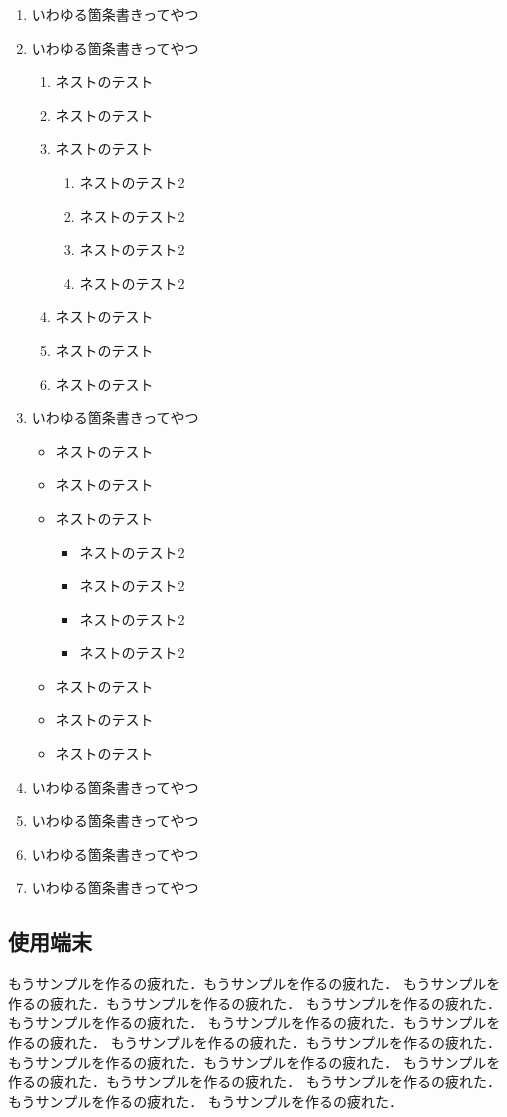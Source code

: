 \begin{enumerate}
\item いわゆる箇条書きってやつ
\item いわゆる箇条書きってやつ
 \begin{enumerate}
    \item ネストのテスト
    \item ネストのテスト
    \item ネストのテスト
     \begin{enumerate}
       \item ネストのテスト2
       \item ネストのテスト2
       \item ネストのテスト2
       \item ネストのテスト2
     \end{enumerate}
    \item ネストのテスト
    \item ネストのテスト\
    \item ネストのテスト
 \end{enumerate}
\item いわゆる箇条書きってやつ
 \begin{itemize}
    \item ネストのテスト
    \item ネストのテスト
    \item ネストのテスト
     \begin{itemize}
       \item ネストのテスト2
       \item ネストのテスト2
       \item ネストのテスト2
       \item ネストのテスト2
     \end{itemize}
    \item ネストのテスト
    \item ネストのテスト\
    \item ネストのテスト
 \end{itemize}
\item いわゆる箇条書きってやつ
\item いわゆる箇条書きってやつ
\item いわゆる箇条書きってやつ
\item いわゆる箇条書きってやつ
\end{enumerate}


\subsection{使用端末}
もうサンプルを作るの疲れた．もうサンプルを作るの疲れた．
もうサンプルを作るの疲れた．もうサンプルを作るの疲れた．
もうサンプルを作るの疲れた．もうサンプルを作るの疲れた．
もうサンプルを作るの疲れた．もうサンプルを作るの疲れた．
もうサンプルを作るの疲れた．もうサンプルを作るの疲れた．
もうサンプルを作るの疲れた．もうサンプルを作るの疲れた．
もうサンプルを作るの疲れた．もうサンプルを作るの疲れた．
もうサンプルを作るの疲れた．もうサンプルを作るの疲れた．
もうサンプルを作るの疲れた．

